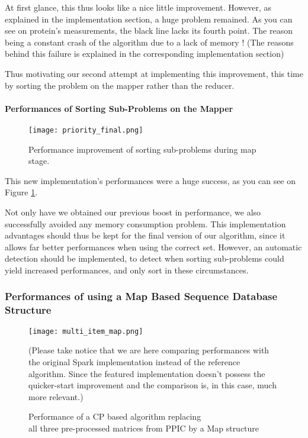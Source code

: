 \documentclass{eplmastersthesis}
\begin{document}
At first glance, this thus looks like a nice little improvement. However, as explained in the implementation section, a huge problem remained. As you can see on protein's measurements, the black line lacks its fourth point. The reason being a constant crash of the algorithm due to a lack of memory ! (The reasons behind this failure is explained in the corresponding implementation section)\newline

Thus motivating our second attempt at implementing this improvement, this time by sorting the problem on the mapper rather than the reducer.

\paragraph{Performances of Sorting Sub-Problems on the Mapper}

\begin{figure}[h]
  \centering
  \texttt{[image: priority\_final.png]}
  \caption{Performance improvement of sorting sub-problems during map stage.}
  \label{fig:priority_scheduling_improved}
\end{figure}

This new implementation's performances were a huge success, as you can see on Figure \ref{fig:priority_scheduling_improved}. \newline

Not only have we obtained our previous boost in performance, we also successfully avoided any memory consumption problem. This implementation advantages should thus be kept for the final version of our algorithm, since it allows far better performances when using the correct set. However, an automatic detection should be implemented, to detect when sorting sub-problems could yield increased performances, and only sort in these circumstances.

\subsubsection{Performances of using a Map Based Sequence Database Structure}

\begin{figure}[h]
  \centering
  \texttt{[image: multi\_item\_map.png]}
  \caption[Map based - multi\_item algorithm]{
  		Performance of a CP based algorithm replacing \\
  		all three pre-processed matrices from PPIC by a Map structure
  	\endtabular
  }
  (Please take notice that we are here comparing performances with the original Spark implementation instead of the reference algorithm. Since the featured implementation doesn't possess the quicker-start improvement and the comparison is, in this case, much more relevant.)
  \label{fig:multi_map}
\end{figure}
\end{document}
